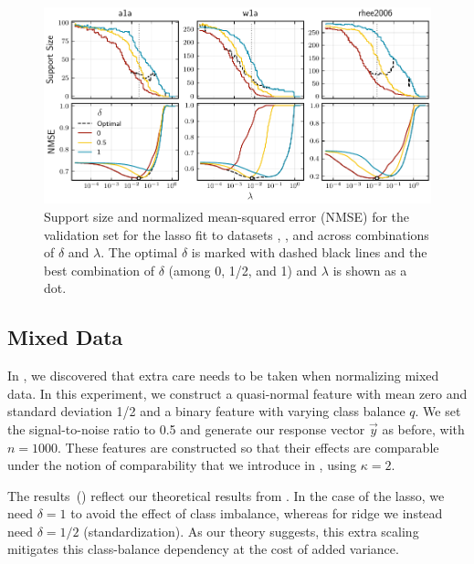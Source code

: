 \begin{figure}[htpb]
  \centering
  \includegraphics[]{plots/hyperopt_paths.pdf}
  \caption{%
    Support size and normalized mean-squared error (NMSE) for the validation set for the lasso fit to datasets , , and  across combinations of \(\delta\) and \(\lambda\). The optimal \(\delta\) is marked with dashed black lines and the best combination of \(\delta\) (among 0, 1/2, and 1) and \(\lambda\) is shown as a dot.
  }
  \label{fig:hyperopt-support}
\end{figure}

\subsection{Mixed Data}\label{sec:experiments-mixed-data}

In , we discovered that extra care needs to be taken when normalizing mixed data. In this experiment, we construct a quasi-normal feature with mean zero and standard deviation 1/2 and a binary feature with varying class balance \(q\). We set the signal-to-noise ratio to 0.5 and generate our response vector \(\vec{y}\) as before, with \(n = \num{1000}\). These features are constructed so that their effects are comparable under the notion of comparability that we introduce in , using \(\kappa = 2\).

The results~() reflect our theoretical results from . In the case of the lasso, we need \(\delta =1\) to avoid the effect of class imbalance, whereas for ridge we instead need \(\delta =1/2\) (standardization). As our theory suggests, this extra scaling mitigates this class-balance dependency at the cost of added variance.

